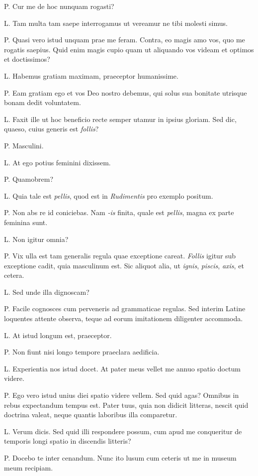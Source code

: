 \documentclass{article}
\begin{document}
P. Cur me de hoc nunquam rogasti?

L. Tam multa tam saepe interrogamus ut vereamur ne tibi molesti simus.

P. Quasi vero istud unquam prae me feram. Contra, eo magis amo vos, quo me rogatis saepius. Quid enim magis cupio quam ut aliquando vos videam et optimos et doctissimos?

L. Habemus gratiam maximam, praeceptor humanissime.

P. Eam gratiam ego et vos Deo nostro debemus, qui solus sua bonitate utrisque bonam dedit voluntatem.

L. Faxit ille ut hoc beneficio recte semper utamur in ipsius gloriam. Sed dic, quaeso, cuius generis est \emph{follis}?

P. Masculini.

L. At ego potius feminini dixissem.

P. Quamobrem?

L. Quia tale est \emph{pellis}, quod est in \emph{Rudimentis} pro exemplo positum.

P. Non abs re id coniciebas. Nam \emph{-is} finita, quale est \emph{pellis}, magna ex parte feminina sunt.

L. Non igitur omnia?

P. Vix ulla est tam generalis regula quae exceptione careat. \emph{Follis} igitur sub exceptione cadit, quia masculinum est. Sic aliquot alia, ut \emph{ignis}, \emph{piscis}, \emph{axis}, et cetera.

L. Sed unde illa dignoscam?

P. Facile cognosces cum perveneris ad grammaticae regulas. Sed interim Latine loquentes attente observa, teque ad eorum imitationem diligenter accommoda.

L. At istud longum est, praeceptor.

P. Non fiunt nisi longo tempore praeclara aedificia.

L. Experientia nos istud docet. At pater meus vellet me annuo spatio doctum videre.

P. Ego vero istud unius diei spatio videre vellem. Sed quid agas? Omnibus in rebus expectandum tempus est. Pater tuus, quia non didicit litteras, nescit quid doctrina valeat, neque quantis laboribus illa comparetur.

L. Verum dicis. Sed quid illi respondere possum, cum apud me conqueritur de temporis longi spatio in discendis litteris?

P. Docebo te inter cenandum. Nunc ito lusum cum ceteris ut me in museum meum recipiam.
\end{document}
